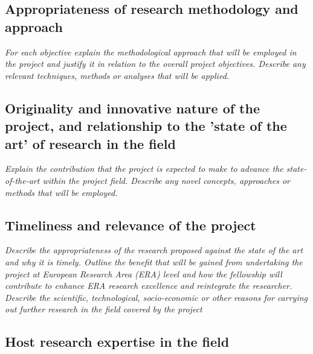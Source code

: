 \documentclass[a4paper,11pt]{article}
\newenvironment{xcomment}{\em}{}
\begin{document}
\begin{bibunit}[../../../../tex/statement2012]
\subsection{Appropriateness of research methodology and approach}

\begin{xcomment}
For each objective explain the methodological approach that will be employed in the project and
justify it in relation to the overall project objectives. Describe any relevant techniques, methods or
analyses that will be applied.
\end{xcomment}

\subsection{Originality and innovative nature of the project, and relationship to the 'state of the art' of research in the field}

\begin{xcomment}
Explain the contribution that the project is expected to make to advance the state-of-the-art within
the project field. Describe any novel concepts, approaches or methods that will be employed.
\end{xcomment}

\subsection{Timeliness and relevance of the project}

\begin{xcomment}
Describe the appropriateness of the research proposed against the state of the art and why it is
timely. Outline the benefit that will be gained from undertaking the project at European Research
Area (ERA) level and how the fellowship will contribute to enhance ERA research excellence and
reintegrate the researcher. Describe the scientific, technological, socio-economic or other
reasons for carrying out further research in the field covered by the project
\end{xcomment}

\subsection{Host research expertise in the field}


\end{bibunit}
\end{document}

